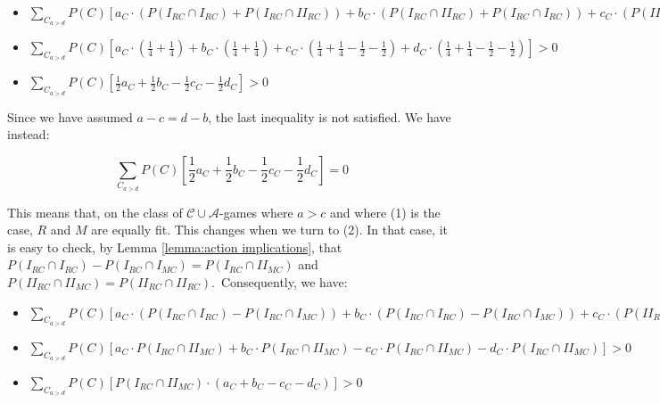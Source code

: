 \documentclass[fleqn,reqno,11pt]{article}
\begin{document}
\begin{itemize}

\item $\sum_{C_{a>d}} P(C)[a_{C} \cdot (P(I_{RC}\cap I_{RC}) + P(I_{RC}\cap II_{RC})) + b_{C} \cdot  (P(I_{RC}\cap II_{RC}) + P(I_{RC}\cap I_{RC})) + c_{C} \cdot (P(II_{RC}\cap I_{RC}) +P(II_{RC}\cap II_{RC})- P(I_{RC}\cap II_{MC})- P(II_{RC}\cap II_{MC})) + d_{C} \cdot (P(II_{RC}\cap II_{RC})+P(II_{RC}\cap I_{RC})- P(II_{RC}\cap II_{MC})- P(I_{RC}\cap II_{MC}))]> 0$

\item $\sum_{C_{a>d}} P(C)[a_{C} \cdot (\frac{1}{4}+\frac{1}{4}) + b_{C} \cdot  (\frac{1}{4}+\frac{1}{4}) + c_{C} \cdot (\frac{1}{4}+\frac{1}{4}-\frac{1}{2}-\frac{1}{2}) + d_{C} \cdot (\frac{1}{4}+\frac{1}{4}-\frac{1}{2}-\frac{1}{2})]> 0$

\item $\sum_{C_{a>d}} P(C)[\frac{1}{2}a_{C}+ \frac{1}{2}b_{C} - \frac{1}{2}c_{C} - \frac{1}{2}d_{C}]> 0$

\end{itemize}

\noindent Since we have assumed $ a-c = d-b $, the last inequality is not satisfied. We have instead: 

$$ \sum_{C_{a>d}} P(C)[\frac{1}{2}a_{C}+ \frac{1}{2}b_{C} - \frac{1}{2}c_{C} - \frac{1}{2}d_{C}]= 0 $$

\noindent This means that, on the class of $\mathcal{C} \cup \mathcal{A}$-games where $a>c$ and
where (1) is the case, $R$ and $M$ are equally fit. This changes when we turn to (2). In that
case, it is easy to check, by Lemma \ref{lemma:action implications}, that
$P(I_{RC} \cap I_{RC})-P(I_{RC}\cap I_{MC})=P(I_{RC}\cap II_{MC})$ and
$P(II_{RC}\cap II_{MC})=P(II_{RC} \cap II_{RC})$.\ Consequently, we
have:

\begin{itemize}

\item $\sum_{C_{a>d}} P(C)[a_{C} \cdot (P(I_{RC}\cap I_{RC}) - P(I_{RC}\cap I_{MC})) + b_{C} \cdot  (P(I_{RC}\cap I_{RC})- P(I_{RC}\cap I_{MC})) + c_{C} \cdot (P(II_{RC}\cap II_{RC})- P(I_{RC}\cap II_{MC})- P(II_{RC}\cap II_{MC})) + d_{C} \cdot (P(II_{RC}\cap II_{RC})- P(II_{RC}\cap II_{MC})- P(I_{RC}\cap II_{MC}))]> 0$

\item $\sum_{C_{a>d}} P(C)[a_{C} \cdot P(I_{RC}\cap II_{MC}) + b_{C} \cdot  P(I_{RC}\cap II_{MC}) - c_{C} \cdot P(I_{RC}\cap II_{MC}) - d_{C} \cdot P(I_{RC}\cap II_{MC})]> 0$

\item $\sum_{C_{a>d}} P(C)[P(I_{RC}\cap II_{MC})\cdot (a_{C} + b_{C} - c_{C} - d_{C})]> 0$

\end{itemize}
\end{document}
